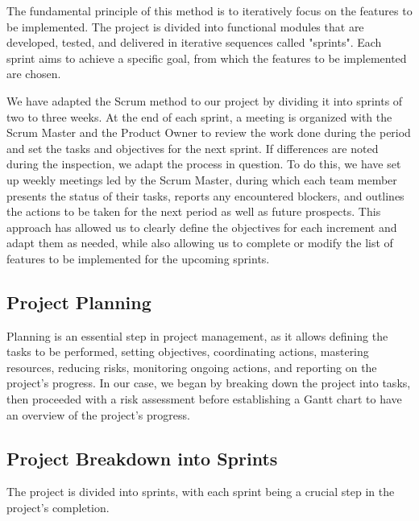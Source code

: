 The fundamental principle of this method is to iteratively focus on the features to be implemented. The project is divided into functional modules that are developed, tested, and delivered in iterative sequences called "sprints". Each sprint aims to achieve a specific goal, from which the features to be implemented are chosen.

We have adapted the Scrum method to our project by dividing it into sprints of two to three weeks. At the end of each sprint, a meeting is organized with the Scrum Master and the Product Owner to review the work done during the period and set the tasks and objectives for the next sprint. If differences are noted during the inspection, we adapt the process in question. To do this, we have set up weekly meetings led by the Scrum Master, during which each team member presents the status of their tasks, reports any encountered blockers, and outlines the actions to be taken for the next period as well as future prospects. This approach has allowed us to clearly define the objectives for each increment and adapt them as needed, while also allowing us to complete or modify the list of features to be implemented for the upcoming sprints.

\subsection{Project Planning}
Planning is an essential step in project management, as it allows defining the tasks to be performed, setting objectives, coordinating actions, mastering resources, reducing risks, monitoring ongoing actions, and reporting on the project's progress. In our case, we began by breaking down the project into tasks, then proceeded with a risk assessment before establishing a Gantt chart to have an overview of the project's progress.

\subsection{Project Breakdown into Sprints}

The project is divided into sprints, with each sprint being a crucial step in the project's completion.

